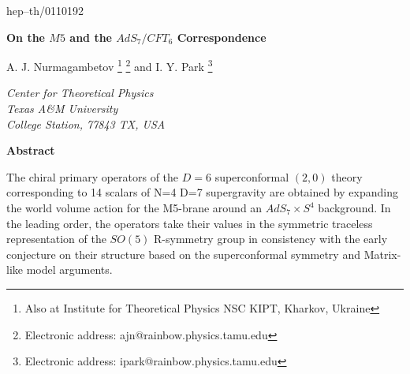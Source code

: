 \documentclass[a4paper,11pt]{article}
\begin{document}
\def\a{\alpha}\def\b{\beta}\def\g{\gamma}\def\d{\delta}\def\e{\epsilon }
\def\k{\kappa}\def\l{\lambda}\def\L{\Lambda}\def\s{\sigma}\def\S{\Sigma}
\def\Th{\Theta}\def\th{\theta}\def\om{\omega}\def\Om{\Omega}\def\G{\Gamma}
\def\y{\vartheta}\def\m{\mu}\def\n{\nu}
\def\ws{worldsheet}
\def\susy{supersymmetry}
\def\ts{target superspace}
\def\ks{$\k$--symmetry}
\newcommand{\plabel}{\label}
\renewcommand\baselinestretch{1.5}
\newcommand{\nn}{\nonumber\\}\newcommand{\p}[1]{(\ref{#1})}
\renewcommand{\thefootnote}{\fnsymbol{footnote}}
\thispagestyle{empty}
\begin{flushright}
hep--th/0110192
\end{flushright}

%





\bigskip
\thispagestyle{empty}

\vspace{1cm}
\begin{center}
{\Large\bf On the $M5$ and the $AdS_7/CFT_6$ Correspondence}



\vspace{2.5cm}
A. J. Nurmagambetov \footnote{Also at Institute for Theoretical
Physics NSC KIPT, Kharkov, Ukraine} \footnote{Electronic address:
ajn@rainbow.physics.tamu.edu} and I. Y. Park \footnote{Electronic
address: ipark@rainbow.physics.tamu.edu}


\vspace{1.8cm}
{\small\it Center for Theoretical Physics\\
Texas A\&M University\\
College Station, 77843 TX, USA}



\vspace{3.3cm} {\bf Abstract}
\end{center}
The chiral primary operators of the $D=6$ superconformal $(2,0)$ theory
corresponding to 14 scalars of N=4 D=7 supergravity are obtained by
expanding the world volume action for the M5-brane around an $AdS_7\times S^4$
background. In the leading order, the operators take their values in the symmetric traceless
representation of the $SO(5)$ R-symmetry group in consistency with the early
conjecture on their structure based on the superconformal symmetry and Matrix-like model arguments.
\end{document}
